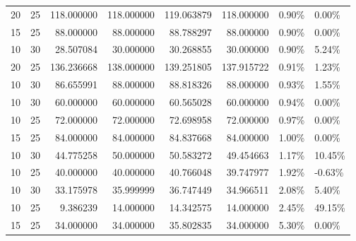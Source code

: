 \documentclass[
  a4paper,
,tablecaptionabove
]{scrartcl}
\numberwithin{equation}{section}
\begin{document}
\begin{table}
\begin{tabular}{|l|l|r|r|r|r|l|l|}
    20    & 25    & 118.000000           & 118.000000            & 119.063879               & 118.000000             & 0.90\%                 & 0.00\%                \\
    15    & 25    & 88.000000            & 88.000000             & 88.788297                & 88.000000              & 0.90\%                 & 0.00\%                \\
    10    & 30    & 28.507084            & 30.000000             & 30.268855                & 30.000000              & 0.90\%                 & 5.24\%                \\
    20    & 25    & 136.236668           & 138.000000            & 139.251805               & 137.915722             & 0.91\%                 & 1.23\%                \\
    10    & 30    & 86.655991            & 88.000000             & 88.818326                & 88.000000              & 0.93\%                 & 1.55\%                \\
    10    & 30    & 60.000000            & 60.000000             & 60.565028                & 60.000000              & 0.94\%                 & 0.00\%                \\
    10    & 25    & 72.000000            & 72.000000             & 72.698958                & 72.000000              & 0.97\%                 & 0.00\%                \\
    15    & 25    & 84.000000            & 84.000000             & 84.837668                & 84.000000              & 1.00\%                 & 0.00\%                \\
    10    & 30    & 44.775258            & 50.000000             & 50.583272                & 49.454663              & 1.17\%                 & 10.45\%               \\
    10    & 25    & 40.000000            & 40.000000             & 40.766048                & 39.747977              & 1.92\%                 & -0.63\%               \\
    10    & 30    & 33.175978            & 35.999999             & 36.747449                & 34.966511              & 2.08\%                 & 5.40\%                \\
    10    & 25    & 9.386239             & 14.000000             & 14.342575                & 14.000000              & 2.45\%                 & 49.15\%               \\
    15    & 25    & 34.000000            & 34.000000             & 35.802835                & 34.000000              & 5.30\%                 & 0.00\%                \\
    \bottomrule
  \end{tabular}
  \small
\end{table}
\end{document}
